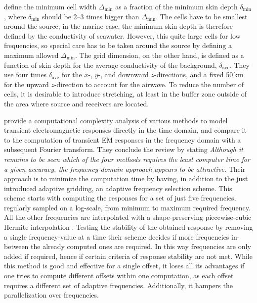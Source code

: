 \documentclass[extra, camera,%
    onecolumn,   %
    referee,     %
]{gji}
\begin{document}
 \cite{GEO.07.Plessix} define the minimum cell width $\Delta_\mathrm{min}$ as
a fraction of the minimum skin depth $\delta_\mathrm{min}$, where
$\delta_\mathrm{min}$ should be 2--3 times bigger than $\Delta_\mathrm{min}$.
The cells have to be smallest around the source; in the marine case, the
minimum skin depth is therefore defined by the conductivity of seawater.
However, this  quite large cells for low
frequencies, so special care has to be taken around the source by defining a
maximum allowed $\Delta_\mathrm{min}$. The grid dimension, on the other hand,
is defined as a function of  skin depth for the average
conductivity of the background, $\delta_\mathrm{ave}$. They use four times
$\delta_\mathrm{ave}$ for the $x$-, $y$-, and downward $z$-directions, and a
fixed 50\,km for the upward $z$-direction to account for the airwave. To reduce
the number of cells, it is desirable to introduce stretching, at least in the
buffer zone outside of the area where source and receivers are located.

\cite{GEO.08.Mulder} provide a computational complexity analysis of various
methods to model transient electromagnetic responses directly in the time
domain, and compare it to the computation of transient EM responses in the
frequency domain with a subsequent Fourier transform. They conclude the review
by stating \emph{\guillemotleft Although it remains to be seen which of the
four methods requires the least computer time for a given accuracy, the
frequency-domain approach appears to be attractive.\guillemotright} Their
approach is to minimize the computation time by having, in addition to the just
introduced adaptive gridding, an adaptive frequency selection scheme. This
scheme starts with computing the responses for a set of just five frequencies,
regularly sampled on a log-scale, from minimum to maximum required frequency.
All the other frequencies are interpolated with a shape-preserving
piecewise-cubic Hermite interpolation \citep[PCHIP, ][]{SIAM.80.Fritsch}.
Testing the stability of the obtained response by removing a single
frequency-value at a time their scheme decides if more frequencies in-between
the already computed ones are required. In this way frequencies are only added
if required, hence if certain criteria of response stability are not met. While
this method is good and effective for a single offset, it loses all its
advantages if one tries to compute different offsets within one computation, as
each offset requires a different set of adaptive frequencies. Additionally, it
hampers the parallelization over frequencies.
\end{document}
